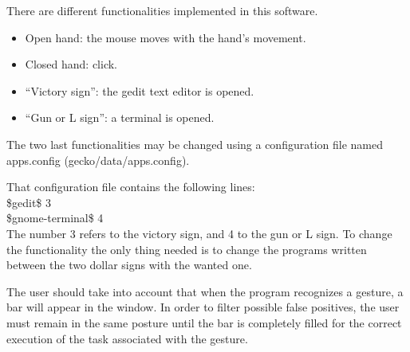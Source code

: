There are different functionalities implemented in this software. 
\begin{itemize}
\item Open hand: the mouse moves with the hand's movement.
\item Closed hand: click.
\item ``Victory sign'': the gedit text editor is opened.
\item ``Gun or L sign'': a terminal is opened. 
\end{itemize}

The two last functionalities may be changed using a configuration file named apps.config (gecko/data/apps.config). 

That configuration file contains the following lines:
\\[0.5cm]
\$gedit\$ 3 \\
\$gnome-terminal\$ 4
\\[0.5cm]

The number 3 refers to the victory sign, and  4 to the gun or L sign. To change the functionality the only thing needed is to change the programs written between the two dollar signs with the wanted one. 

The user should take into account that when the program recognizes a gesture, a bar will appear in the window. In order to filter possible false positives, the user must remain in the same posture until the bar is completely filled for the correct execution of the task associated with the gesture. 


\newpage

